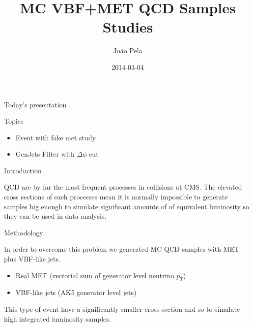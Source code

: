 \documentclass[8pt]{beamer}
\author[J. Pela]{João Pela}
\title[MC VBF QCD]{MC VBF+MET QCD Samples Studies}
\institute[ICL]{Imperial College London}
\date{2014-03-04}
\begin{document}
\setlength{\unitlength}{1mm}

\begin{frame}
  \titlepage
\end{frame}

\begin{frame}{Today's presentation}
 
\begin{block}{Topics}
 
\begin{itemize}
  \item Event with fake met study
  \item GenJets Filter with $\Delta\phi$ cut
\end{itemize}
 
\end{block}

\end{frame}

\begin{frame}{Introduction}

QCD are by far the most frequent processes in collisions at CMS. The elevated cross sections of such processes mean it is normally impossible to generate samples big enough to simulate 
significant amounts of of equivalent luminosity so they can be used in data analysis.

\begin{block}{Methodology}

In order to overcome this problem we generated MC QCD samples with MET plus VBF-like jets.
\begin{itemize}
  \item Real MET (vectorial sum of generator level neutrino $p_T$)
  \item VBF-like jets (AK5 generator level jets)
\end{itemize}

\end{block}

This type of event have a significantly smaller cross section and so to simulate high integrated luminosity samples. 
 
\end{frame}
\end{document}
